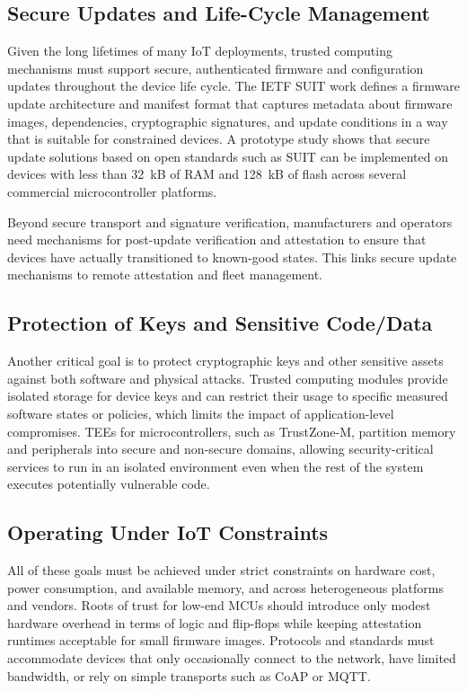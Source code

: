 \documentclass[conference,11pt,a4paper]{IEEEtran}
\begin{document}
\subsection{Secure Updates and Life-Cycle Management}
Given the long lifetimes of many IoT deployments, trusted computing mechanisms must support secure, authenticated firmware and configuration updates throughout the device life cycle. The IETF SUIT work defines a firmware update architecture and manifest format that captures metadata about firmware images, dependencies, cryptographic signatures, and update conditions in a way that is suitable for constrained devices.\cite{suit_arch} A prototype study shows that secure update solutions based on open standards such as SUIT can be implemented on devices with less than 32~kB of RAM and 128~kB of flash across several commercial microcontroller platforms.\cite{suit_survey}

Beyond secure transport and signature verification, manufacturers and operators need mechanisms for post-update verification and attestation to ensure that devices have actually transitioned to known-good states. This links secure update mechanisms to remote attestation and fleet management.\cite{rats_arch,suit_arch}

\subsection{Protection of Keys and Sensitive Code/Data}
Another critical goal is to protect cryptographic keys and other sensitive assets against both software and physical attacks. Trusted computing modules provide isolated storage for device keys and can restrict their usage to specific measured software states or policies, which limits the impact of application-level compromises.\cite{tcg_tpm_iot} TEEs for microcontrollers, such as TrustZone-M, partition memory and peripherals into secure and non-secure domains, allowing security-critical services to run in an isolated environment even when the rest of the system executes potentially vulnerable code.\cite{tzm_runtime,tzm_framework}

\subsection{Operating Under IoT Constraints}
All of these goals must be achieved under strict constraints on hardware cost, power consumption, and available memory, and across heterogeneous platforms and vendors.\cite{suit_survey,ra_survey} Roots of trust for low-end MCUs should introduce only modest hardware overhead in terms of logic and flip-flops while keeping attestation runtimes acceptable for small firmware images.\cite{root_of_trust_lowend,vRased_usenix} Protocols and standards must accommodate devices that only occasionally connect to the network, have limited bandwidth, or rely on simple transports such as CoAP or MQTT.\cite{rats_arch,suit_arch}
\end{document}
